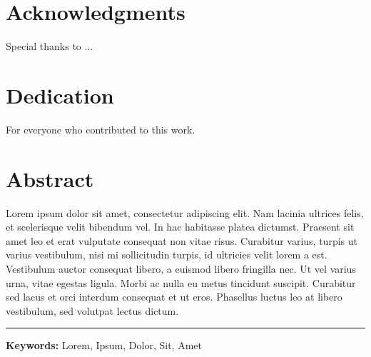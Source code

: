 \documentclass[a4paper, 12pt]{article} %
\begin{document}

\thispagestyle{empty}


\centering
\section*{Acknowledgments}
\begin{flushleft}
    Special thanks to ...
\end{flushleft}
\vspace{3cm}

\section*{Dedication}
\begin{flushleft}
   For everyone who contributed to this work. 
\end{flushleft}
\newpage


\setcounter{page}{3}

\section*{Abstract}
\centering
\justifying
\noindent
Lorem ipsum dolor sit amet, consectetur adipiscing elit. Nam lacinia ultrices felis, et scelerisque velit bibendum vel. In hac habitasse platea dictumst. Praesent sit amet leo et erat vulputate consequat non vitae risus. Curabitur varius, turpis ut varius vestibulum, nisi mi sollicitudin turpis, id ultricies velit lorem a est. Vestibulum auctor consequat libero, a euismod libero fringilla nec. Ut vel varius urna, vitae egestas ligula. Morbi ac nulla eu metus tincidunt suscipit. Curabitur sed lacus et orci interdum consequat et ut eros. Phasellus luctus leo at libero vestibulum, sed volutpat lectus dictum.

\vspace{0.5cm} %

\begin{flushleft}
    \noindent\rule{\textwidth}{0.4pt} %
\vspace{0.5cm}
\textbf{Keywords:} Lorem, Ipsum, Dolor, Sit, Amet
\end{flushleft}
\newpage


\pagebreak
\centering
\renewcommand{\contentsname}{Table of Contents} %
\renewcommand{\cftsecleader}{\cftdotfill{\cftdotsep}} %
\tableofcontents
{} %
\newpage
\end{document}
